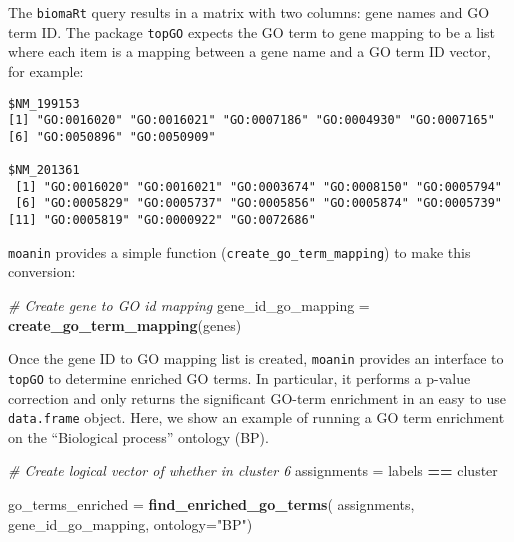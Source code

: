 \documentclass[9pt,a4paper,]{extarticle}
\newenvironment{Shaded}{\begin{snugshade}}{\end{snugshade}}
\newcommand{\CommentTok}[1]{\textcolor[rgb]{0.56,0.35,0.01}{\textit{#1}}}
\newcommand{\DataTypeTok}[1]{\textcolor[rgb]{0.13,0.29,0.53}{#1}}
\newcommand{\KeywordTok}[1]{\textcolor[rgb]{0.13,0.29,0.53}{\textbf{#1}}}
\newcommand{\NormalTok}[1]{#1}
\newcommand{\OperatorTok}[1]{\textcolor[rgb]{0.81,0.36,0.00}{\textbf{#1}}}
\newcommand{\StringTok}[1]{\textcolor[rgb]{0.31,0.60,0.02}{#1}}
\begin{document}
The \texttt{biomaRt} query results in a matrix with two columns: gene names and GO
term ID. The package \texttt{topGO} \citep{alexa:topgo} expects the GO term to gene
mapping to be a list where each item is a mapping between a gene name and a GO
term ID vector, for example:

\begin{verbatim}
$NM_199153
[1] "GO:0016020" "GO:0016021" "GO:0007186" "GO:0004930" "GO:0007165"
[6] "GO:0050896" "GO:0050909"

$NM_201361
 [1] "GO:0016020" "GO:0016021" "GO:0003674" "GO:0008150" "GO:0005794"
 [6] "GO:0005829" "GO:0005737" "GO:0005856" "GO:0005874" "GO:0005739"
[11] "GO:0005819" "GO:0000922" "GO:0072686"
\end{verbatim}

\texttt{moanin} provides a simple function (\texttt{create\_go\_term\_mapping}) to make this conversion:

\begin{Shaded}
\begin{Highlighting}[]
\CommentTok{# Create gene to GO id mapping}
\NormalTok{gene_id_go_mapping =}\StringTok{ }\KeywordTok{create_go_term_mapping}\NormalTok{(genes)}
\end{Highlighting}
\end{Shaded}

Once the gene ID to GO mapping list is created, \texttt{moanin} provides an interface
to \texttt{topGO} to determine enriched GO terms. In particular, it performs a
p-value correction and only returns the significant GO-term enrichment in an
easy to use \texttt{data.frame} object. Here, we show an example of running a GO term
enrichment on the ``Biological process'' ontology (BP).

\begin{Shaded}
\begin{Highlighting}[]
\CommentTok{# Create logical vector of whether in cluster 6}
\NormalTok{assignments =}\StringTok{ }\NormalTok{labels }\OperatorTok{==}\StringTok{ }\NormalTok{cluster}

\NormalTok{go_terms_enriched =}\StringTok{ }\KeywordTok{find_enriched_go_terms}\NormalTok{(}
\NormalTok{    assignments,}
\NormalTok{    gene_id_go_mapping, }\DataTypeTok{ontology=}\StringTok{"BP"}\NormalTok{)}
\end{Highlighting}
\end{Shaded}
\end{document}
